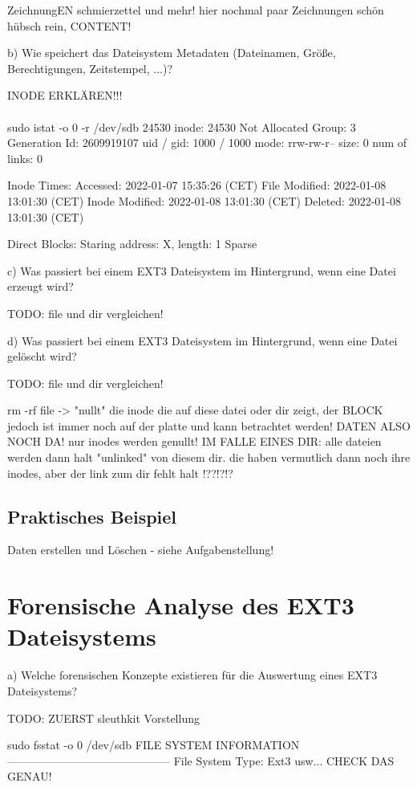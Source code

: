ZeichnungEN schmierzettel und mehr! hier nochmal paar Zeichnungen schön hübsch rein, CONTENT!

b) Wie speichert das Dateisystem Metadaten (Dateinamen, Größe, Berechtigungen, Zeitstempel, ...)? 

INODE ERKLÄREN!!!\\
\\

sudo istat -o 0 -r /dev/sdb 24530
inode: 24530
Not Allocated
Group: 3
Generation Id: 2609919107
uid / gid: 1000 / 1000
mode: rrw-rw-r--
size: 0
num of links: 0

Inode Times:
Accessed:	2022-01-07 15:35:26 (CET)
File Modified:	2022-01-08 13:01:30 (CET)
Inode Modified:	2022-01-08 13:01:30 (CET)
Deleted:	2022-01-08 13:01:30 (CET)

Direct Blocks:
Staring address: X, length: 1  Sparse



c) Was passiert bei einem EXT3 Dateisystem im Hintergrund, wenn eine Datei erzeugt wird?  

TODO: file und dir vergleichen!

d) Was passiert bei einem EXT3 Dateisystem im Hintergrund, wenn eine Datei gelöscht wird?

TODO: file und dir vergleichen!

rm -rf file -> "nullt" die inode die auf diese datei oder dir zeigt, der BLOCK jedoch ist immer noch auf der platte und kann betrachtet werden! DATEN ALSO NOCH DA! nur inodes werden genullt!
IM FALLE EINES DIR: 
alle dateien werden dann halt "unlinked" von diesem dir. die haben vermutlich dann noch ihre inodes, aber der link zum dir fehlt halt !??!?!?



\subsection{Praktisches Beispiel}

Daten erstellen und Löschen - siehe Aufgabenstellung!

\section{Forensische Analyse des EXT3 Dateisystems}

a) Welche forensischen Konzepte existieren für die Auswertung eines EXT3 Dateisystems? 

TODO: ZUERST sleuthkit Vorstellung


sudo fsstat -o 0 /dev/sdb
FILE SYSTEM INFORMATION
--------------------------------------------
File System Type: Ext3
usw... CHECK DAS GENAU!


